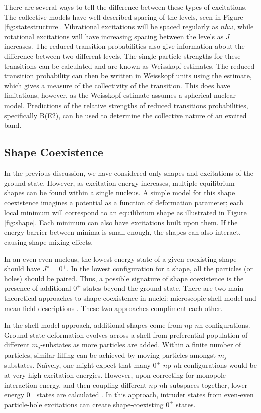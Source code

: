 There are several ways to tell the difference between these types of excitations. The collective models have well-described spacing of the levels, seen in Figure \ref{fig:statestructure}. Vibrational excitations will be spaced regularly as $n\hbar\omega$, while rotational excitations will have increasing spacing between the levels as $J$ increases. The reduced transition probabilities also give information about the difference between two different levels\citep{wong90:_nuclear}. The single-particle strengths for these transitions can be calculated and are known as Weisskopf estimates. The reduced transition probability can then be written in Weisskopf units using the estimate, which gives a measure of the collectivity of the transition. This does have limitations, however, as the Weisskopf estimate assumes a spherical nuclear model. Predictions of the relative strengths of reduced transitions probabilities, specifically B(E2), can be used to determine the collective nature of an excited band\citep{rowe10:_nuclearmodel}.

\subsection{Shape Coexistence}

In the previous discussion, we have considered only shapes and excitations of the ground state. However, as excitation energy increases, multiple equilibrium shapes can be found within a single nucleus. A simple model for this shape coexistence imagines a potential as a function of deformation parameter; each local minimum will correspond to an equilibrium shape as illustrated in Figure \ref{fig:shape}. Each minimum can also have excitations built upon them. If the energy barrier between minima is small enough, the shapes can also interact, causing shape mixing effects.



In an even-even nucleus, the lowest energy state of a given coexisting shape should have $J^{\pi}=0^+$. In the lowest configuration for a shape, all the particles (or holes) should be paired. Thus, a possible signature of shape coexistence is the presence of additional $0^+$ states beyond the ground state. There are two main theoretical approaches to shape coexistence in nuclei: microscopic shell-model and mean-field descriptions \citep{heyde11:_shape_coexist}. These two approaches compliment each other. 

In the shell-model approach, additional shapes come from $n$p-$n$h configurations. Ground state deformation evolves across a shell from preferential population of different $m_j$-substates as more particles are added. Within a finite number of particles, similar filling can be achieved by moving particles amongst $m_j$-substates. Na\"ively, one might expect that many $0^+$ $n$p-$n$h configurations would be at very high excitation energies. However, upon correcting for monopole interaction energy, and then coupling different $n$p-$n$h subspaces together, lower energy $0^+$ states are calculated \citep{caurier07:_shape_coexist}. In this approach, intruder states from even-even particle-hole excitations can create shape-coexisting $0^+$ states.

